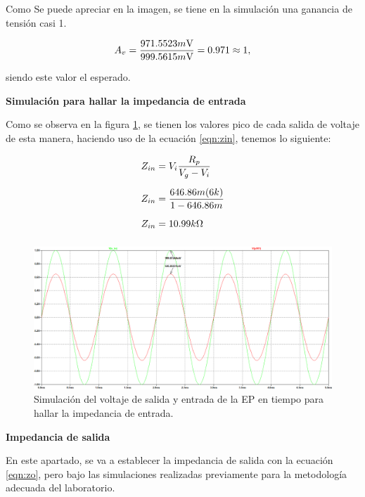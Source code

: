 \begin{enumerate}
        Como Se puede apreciar en la imagen, se tiene en la simulación una ganancia de tensión casi 1.

        $$A_v=\dfrac{971.5523 m\volt}{999.5615 m\volt}= 0.971 \approx 1, $$

        siendo este valor el esperado.

        \textbf{Simulación para hallar la impedancia de entrada}

        Como se observa en la figura \ref{fig:zinep}, se tienen los valores pico de cada salida de voltaje de esta manera, haciendo uso de la ecuación \ref{eqn:zin}, tenemos lo siguiente:

        \begin{align*}
          Z_{in} & = V_i \dfrac{R_p}{V_g-V_i}      \\[0.2cm]
          Z_{in} & =\dfrac{646.86m(6k)}{1-646.86m} \\[0.2cm]
          Z_{in} & =10.99k\ohm                     \\[0.2cm]
        \end{align*}

        \begin{figure}[H]
          \centering
          \includegraphics[width=\textwidth]{Imagenes/zinep.png}
          \caption{Simulación del voltaje de salida y entrada de la EP en tiempo para hallar la impedancia de entrada.}
          \label{fig:zinep}
        \end{figure}

        \textbf{Impedancia de salida}

        En este apartado, se va a establecer la impedancia de salida con la ecuación \ref{eqn:zo}, pero bajo las simulaciones realizadas previamente para la metodología adecuada del laboratorio.


\end{enumerate}
